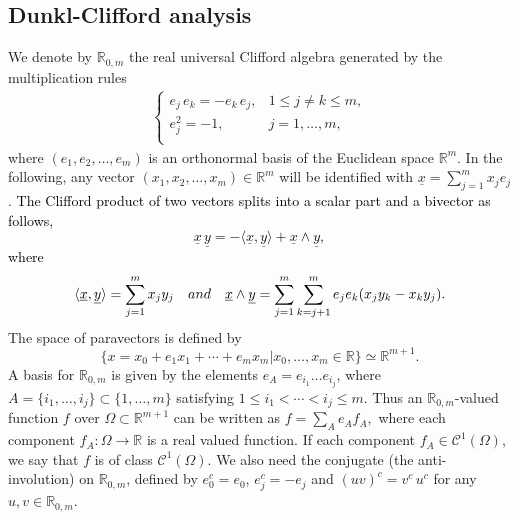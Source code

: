 \documentclass{amsart}
\theoremstyle{definition}
\theoremstyle{remark}
\numberwithin{equation}{section}
\begin{document}
\subsection{Dunkl-Clifford analysis}
We denote by $\mathbb{R}_{0,m}$ the real universal Clifford algebra  generated by the multiplication rules
\begin{equation*}
    		\begin{split}
    			\left\{
    			\begin{array}{ll}
    				e_{j}\,e_{k}=-e_{k}\,e_{j}, & 1\le j\neq k\le m,\\
    				e_{j}^{2}=-1, & j=1,\ldots, m,\\
    			\end{array}
    			\right.
    		\end{split}
    	\end{equation*}
where $(e_{1}, e_{2}, \ldots, e_{m})$ is an orthonormal basis of the Euclidean space $\mathbb{R}^{m}$. In the following, any vector  $ (x_{1}, x_{2}, \ldots, x_{m})\in \mathbb{R}^{m}$ will be identified with
$\underline{x}=\sum_{j=1}^{m}x_{j}e_{j}$. \textcolor{black}{The Clifford product of two vectors splits into a scalar part  and a bivector as follows,
\begin{equation} \label{iw1}
    \underline{x} \,\underline{y}=-\langle \underline{x}, \underline{y}\rangle+\underline{x}\wedge \underline{y},
\end{equation}
where \begin{equation*}
    \langle \underline{x}, \underline{y}\rangle=\sum_{j=1}^{m}x_{j}y_{j} \quad
{\rm and} \quad
    \underline{x}\wedge \underline{y}=\sum_{j=1}^{m}\sum_{k=j+1}^{m}e_{j}e_{k}(x_{j}y_{k}-x_{k}y_{j}).
\end{equation*}}
The space of  paravectors  is defined  by
\begin{equation*}
    \{x=x_{0}+e_{1}x_{1}+\cdots+e_{m}x_{m}|x_{0}, \ldots, x_{m}\in \mathbb{R}\}\simeq \mathbb{R}^{m+1}.
\end{equation*}
 A basis for $\mathbb{R}_{0,m}$ is given by the elements $e_{A}=e_{i_{1}}\ldots e_{i_{j}}$, where $A=\{i_{1}, \ldots, i_{j}\}\subset \{1, \ldots, m\}$ satisfying $1\le i_{1}<\cdots<i_{j}\le m$. Thus an $\mathbb{R}_{0,m}$-valued function $f$ over $\Omega \subset \mathbb{R}^{m+1} $ can be written as
$
    f=\sum_{A}e_{A}f_{A},
$
where each component $f_{A}: \Omega\rightarrow \mathbb{R}$ is a real valued function. If each component $f_{A}\in \mathcal{C}^{1}(\Omega)$, we say that  $f$ is of class  $\mathcal{C}^{1}(\Omega)$.  We also need the conjugate (the anti-involution) on $\mathbb{R}_{0,m}$, defined by $e_{0}^c=e_{0}$, $e_{j}^c=-e_{j}$ and $(uv)^c=v^c\,u^c$ for any $u, v\in \mathbb{R}_{0,m}$.
\end{document}
